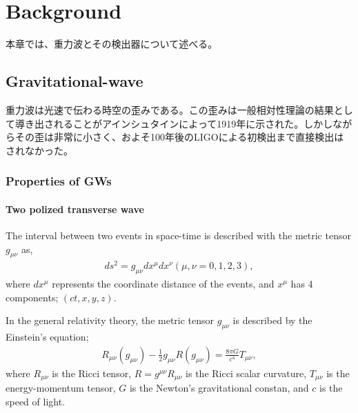 \chapter{Background}
本章では、重力波とその検出器について述べる。


\section{Gravitational-wave}
重力波は光速で伝わる時空の歪みである。この歪みは一般相対性理論の結果として導き出されることがアインシュタインによって1919年に示された。しかしながらその歪は非常に小さく、およそ100年後のLIGOによる初検出まで直接検出はされなかった。

\subsection{Properties of GWs}
\subsubsection{Two polized transverse wave}
The interval between two events in space-time is
described with the metric tensor $g_{\mu\nu}$ as, 
\begin{eqnarray}
  d s^{2}=g_{\mu \nu} d x^{\mu} d x^{\nu} (\mu,\nu = 0,1,2,3),
\end{eqnarray}
where $dx^{\mu}$ represents the coordinate distance of the events, and $x^{\mu}$ has 4 components; $(ct,x,y,z)$.

In the general relativity theory\cite{einstein1916vd}, the metric tensor $g_{\mu\nu}$ is described by the Einstein's equation;
\begin{eqnarray}
  R_{\mu \nu}\left(g_{\mu \nu}\right)-\frac{1}{2} g_{\mu \nu} R\left(g_{\mu \nu}\right)=\frac{8 \pi G}{c^{4}} T_{\mu \nu},
\end{eqnarray}
where $R_{\mu\nu}$ is the Ricci tensor, $R=g^{\mu \nu} R_{\mu \nu}$ is the Ricci scalar curvature, $T_{\mu\nu}$ is the energy-momentum tensor, $G$ is the Newton's gravitational constan, and $c$ is the speed of light.

